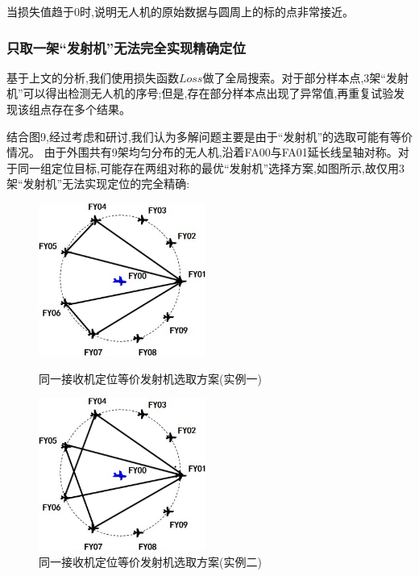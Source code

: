 \documentclass[withoutpreface,bwprint]{cumcmthesis}
\begin{document}
	当损失值趋于0时,说明无人机的原始数据与圆周上的标的点非常接近。
	
	\subsubsection{只取一架“发射机”无法完全实现精确定位}
	
	基于上文的分析,我们使用损失函数$Loss$做了全局搜索。对于部分样本点,3架“发射机”可以得出检测无人机的序号;但是,存在部分样本点出现了异常值,再重复试验发现该组点存在多个结果。
	
	结合图9,经过考虑和研讨,我们认为多解问题主要是由于“发射机”的选取可能有等价情况。
	由于外围共有9架均匀分布的无人机,沿着FA00与FA01延长线呈轴对称。对于同一组定位目标,可能存在两组对称的最优“发射机”选择方案,如图所示,故仅用3架“发射机”无法实现定位的完全精确:
	
	
	\begin{figure}[!htpb]
		\begin{minipage}{0.48\linewidth}
			\centering
			\includegraphics[height=5cm]{./figures/6-7.png}
			\caption{同一接收机定位等价发射机选取方案(实例一)}\label{fig:19}
		\end{minipage}
		\begin{minipage}{0.48\linewidth}
			\centering
			\includegraphics[height=5cm]{./figures/6-8.png}
			\caption{同一接收机定位等价发射机选取方案(实例二)}\label{fig:20}
		\end{minipage}
	\end{figure}
	
\end{document}
